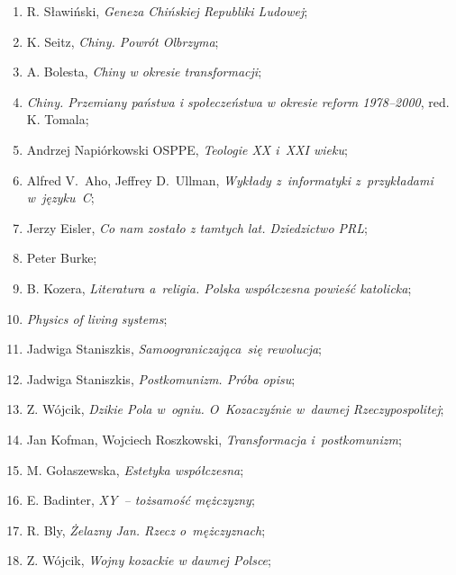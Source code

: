 \documentclass[a4paper,11pt]{article}
\begin{document}
\begin{enumerate}
\item R. Sławiński, \textit{Geneza Chińskiej Republiki Ludowej};

\item K. Seitz, \textit{Chiny. Powrót Olbrzyma};

\item A. Bolesta, \textit{Chiny w okresie transformacji};

\item \textit{Chiny. Przemiany państwa i społeczeństwa w okresie reform
    1978--2000}, red. K. Tomala;

\item Andrzej Napiórkowski OSPPE, \textit{Teologie XX i~XXI wieku};

\item Alfred V.~Aho, Jeffrey D.~Ullman, \textit{Wykłady z~informatyki
    z~przykładami w~języku~C};

\item Jerzy Eisler, \textit{Co nam zostało z tamtych lat. Dziedzictwo
    PRL};

\item Peter Burke;

\item B. Kozera, \textit{Literatura a~religia. Polska współczesna
    powieść katolicka};

\item \textit{Physics of living systems};

\item Jadwiga Staniszkis, \textit{Samoograniczająca~się rewolucja};

\item Jadwiga Staniszkis, \textit{Postkomunizm. Próba opisu};

\item Z. Wójcik, \textit{Dzikie Pola w~ogniu. O~Kozaczyźnie w~dawnej
    Rzeczypospolitej};

\item Jan Kofman, Wojciech Roszkowski, \textit{Transformacja
    i~postkomunizm};

\item M. Gołaszewska, \textit{Estetyka współczesna};

\item E. Badinter, \textit{XY~-- tożsamość mężczyzny};

\item R. Bly, \textit{Żelazny Jan. Rzecz o~mężczyznach};

\item Z. Wójcik, \textit{Wojny kozackie w dawnej Polsce};


\end{enumerate}
\end{document}
